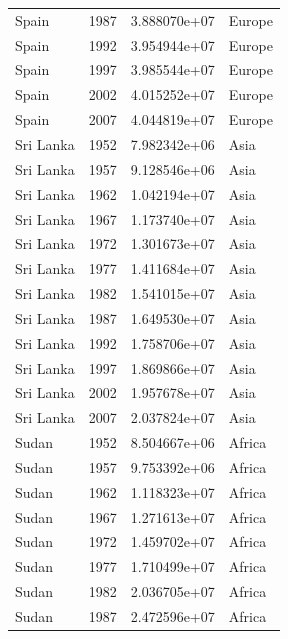 \documentclass[
  letterpaper,
  DIV=11,
  numbers=noendperiod]{scrreprt}
\begin{document}
\begin{tcolorbox}
\begin{tabular}{lrrl}
Spain                    &  1987 &  3.888070e+07 &    Europe \\
Spain                    &  1992 &  3.954944e+07 &    Europe \\
Spain                    &  1997 &  3.985544e+07 &    Europe \\
Spain                    &  2002 &  4.015252e+07 &    Europe \\
Spain                    &  2007 &  4.044819e+07 &    Europe \\
Sri Lanka                &  1952 &  7.982342e+06 &      Asia \\
Sri Lanka                &  1957 &  9.128546e+06 &      Asia \\
Sri Lanka                &  1962 &  1.042194e+07 &      Asia \\
Sri Lanka                &  1967 &  1.173740e+07 &      Asia \\
Sri Lanka                &  1972 &  1.301673e+07 &      Asia \\
Sri Lanka                &  1977 &  1.411684e+07 &      Asia \\
Sri Lanka                &  1982 &  1.541015e+07 &      Asia \\
Sri Lanka                &  1987 &  1.649530e+07 &      Asia \\
Sri Lanka                &  1992 &  1.758706e+07 &      Asia \\
Sri Lanka                &  1997 &  1.869866e+07 &      Asia \\
Sri Lanka                &  2002 &  1.957678e+07 &      Asia \\
Sri Lanka                &  2007 &  2.037824e+07 &      Asia \\
Sudan                    &  1952 &  8.504667e+06 &    Africa \\
Sudan                    &  1957 &  9.753392e+06 &    Africa \\
Sudan                    &  1962 &  1.118323e+07 &    Africa \\
Sudan                    &  1967 &  1.271613e+07 &    Africa \\
Sudan                    &  1972 &  1.459702e+07 &    Africa \\
Sudan                    &  1977 &  1.710499e+07 &    Africa \\
Sudan                    &  1982 &  2.036705e+07 &    Africa \\
Sudan                    &  1987 &  2.472596e+07 &    Africa \\

\end{tabular}
\end{tcolorbox}
\end{document}

